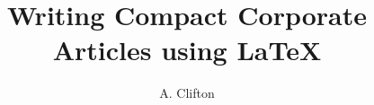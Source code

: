 \documentclass[twocolumn,a4paper,10pt,logo,tagged]{CorporateCompact}
\title{Writing Compact Corporate Articles using LaTeX}
\author{A. Clifton}
\begin{document}

\tableofcontents
\listoffigures
\listoftables







\label{sec:TheBibliography}
\printbibliography

\appendix


\end{document}
